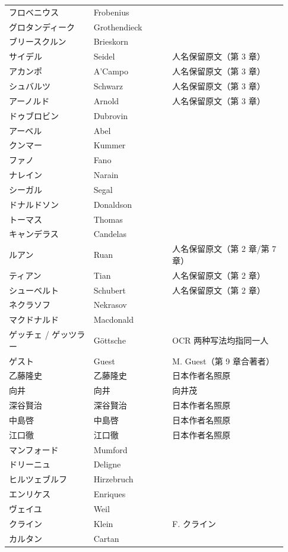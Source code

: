 \begin{longtable}{@{}>{\raggedright\arraybackslash}p{0.29\linewidth}>{\raggedright\arraybackslash}p{0.26\linewidth}>{\raggedright\arraybackslash}p{0.38\linewidth}@{}}
フロベニウス & Frobenius &  \\
グロタンディーク & Grothendieck &  \\
ブリースクルン & Brieskorn &  \\
サイデル & Seidel & 人名保留原文（第 3 章） \\
アカンポ & A'Campo & 人名保留原文（第 3 章） \\
シュバルツ & Schwarz & 人名保留原文（第 3 章） \\
アーノルド & Arnold & 人名保留原文（第 3 章） \\
ドゥブロビン & Dubrovin &  \\
アーベル & Abel &  \\
クンマー & Kummer &  \\
ファノ & Fano &  \\
ナレイン & Narain &  \\
シーガル & Segal &  \\
ドナルドソン & Donaldson &  \\
トーマス & Thomas &  \\
キャンデラス & Candelas &  \\
ルアン & Ruan & 人名保留原文（第 2 章/第 7 章） \\
ティアン & Tian & 人名保留原文（第 2 章） \\
シューベルト & Schubert & 人名保留原文（第 2 章） \\
ネクラソフ & Nekrasov &  \\
マクドナルド & Macdonald &  \\
ゲッチェ / ゲッツラー & Göttsche & OCR 两种写法均指同一人 \\
ゲスト & Guest & M. Guest（第 9 章合著者） \\
乙藤隆史 & \mbox{乙藤隆史} & 日本作者名照原 \\
向井 & \mbox{向井} & 向井茂 \\
深谷賢治 & \mbox{深谷賢治} & 日本作者名照原 \\
中島啓 & \mbox{中島啓} & 日本作者名照原 \\
江口徹 & \mbox{江口徹} & 日本作者名照原 \\
マンフォード & Mumford &  \\
ドリーニュ & Deligne &  \\
ヒルツェブルフ & Hirzebruch &  \\
エンリケス & Enriques &  \\
ヴェイユ & Weil &  \\
クライン & Klein & F. クライン \\
カルタン & Cartan &  \\

\end{longtable}
